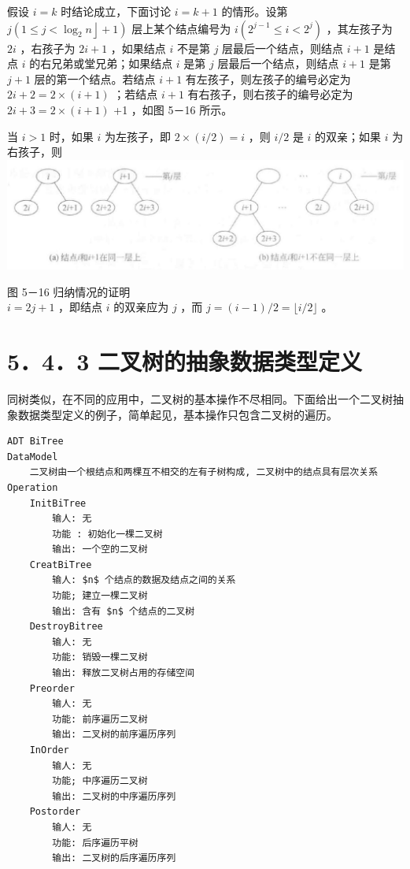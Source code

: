 \documentclass[10pt]{article}
\begin{document}
假设 $i=k$ 时结论成立，下面讨论 $i=k+1$ 的情形。设第 $\left.j\left(1 \leqslant j<\log _{2} n\right\rfloor+1\right)$ 层上某个结点编号为 $i\left(2^{j-1} \leqslant i<2^{j}\right)$ ，其左孩子为 $2 i$ ，右孩子为 $2 i+1$ ，如果结点 $i$ 不是第 $j$ 层最后一个结点，则结点 $i+1$ 是结点 $i$ 的右兄弟或堂兄弟；如果结点 $i$ 是第 $j$ 层最后一个结点，则结点 $i+1$ 是第 $j+1$ 层的第一个结点。若结点 $i+1$ 有左孩子，则左孩子的编号必定为 $2 i+2=2 \times(i+1)$ ；若结点 $i+1$ 有右孩子，则右孩子的编号必定为 $2 i+3=2 \times(i+1)$ +1 ，如图 5－16 所示。

当 $i>1$ 时，如果 $i$ 为左孩子，即 $2 \times(i / 2)=i$ ，则 $i / 2$ 是 $i$ 的双亲；如果 $i$ 为右孩子，则\\
\includegraphics[max width=\textwidth, center]{2025_06_06_704745ea57b15b2333e5g-151}

图 5－16 归纳情况的证明\\
$i=2 j+1$ ，即结点 $i$ 的双亲应为 $j$ ，而 $j=(i-1) / 2=\lfloor i / 2\rfloor$ 。

\section*{5．4．3 二叉树的抽象数据类型定义}
同树类似，在不同的应用中，二叉树的基本操作不尽相同。下面给出一个二叉树抽象数据类型定义的例子，简单起见，基本操作只包含二叉树的遍历。

\begin{verbatim}
ADT BiTree
DataModel
    二叉树由一个根结点和两棵互不相交的左有子树构成, 二叉树中的结点具有层次关系
Operation
    InitBiTree
        输人: 无
        功能 : 初始化一棵二叉树
        输出: 一个空的二叉树
    CreatBiTree
        输人: $n$ 个结点的数据及结点之间的关系
        功能; 建立一棵二叉树
        输出: 含有 $n$ 个结点的二叉树
    DestroyBitree
        输人: 无
        功能: 销毁一棵二叉树
        输出: 释放二叉树占用的存储空间
    Preorder
        输人: 无
        功能: 前序遍历二叉树
        输出: 二叉树的前序遍历序列
    InOrder
        输人: 无
        功能; 中序遍历二叉树
        输出: 二叉树的中序遍历序列
    Postorder
        输人: 无
        功能: 后序遍历平树
        输出: 二叉树的后序遍历序列
\end{verbatim}
\end{document}
